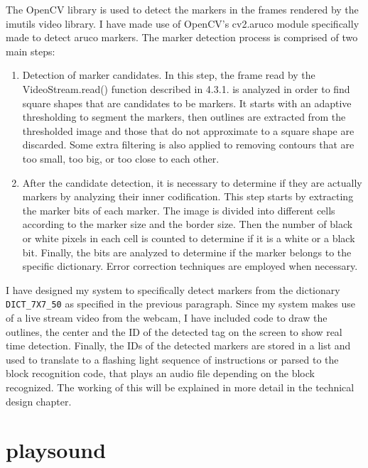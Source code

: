 \documentclass[oneside,%
                    author={Malak Hajji},
                    degree={BSc},
                    title={Designing An Accessible Computational Toolkit For Students},
                  subtitle={With Mixed Visual Abilities}]{dissertation}
\begin{document}
The OpenCV library is used to detect the markers in the frames rendered by the imutils video library. I have made use of OpenCV’s cv2.aruco module specifically made to detect aruco markers. The marker detection process is comprised of two main steps:
\begin{enumerate}
    \item Detection of marker candidates. In this step, the frame read by the VideoStream.read() function described in 4.3.1. is analyzed in order to find square shapes that are candidates to be markers. It starts with an adaptive thresholding to segment the markers, then outlines are extracted from the thresholded image and those that do not approximate to a square shape are discarded. Some extra filtering is also applied to removing contours that are too small, too big, or too close to each other.
    \item After the candidate detection, it is necessary to determine if they are actually markers by analyzing their inner codification. This step starts by extracting the marker bits of each marker. The image is divided into different cells according to the marker size and the border size. Then the number of black or white pixels in each cell is counted to determine if it is a white or a black bit. Finally, the bits are analyzed to determine if the marker belongs to the specific dictionary. Error correction techniques are employed when necessary.
\end{enumerate}
I have designed my system to specifically detect markers from the dictionary \texttt{DICT\_7X7\_50} as specified in the previous paragraph. Since my system makes use of a live stream video from the webcam, I have included code to draw the outlines, the center and the ID of the detected tag on the screen to show real time detection. 
Finally, the IDs of the detected markers are stored in a list and used to translate to a flashing light sequence of instructions or parsed to the block recognition code, that plays an audio file depending on the block recognized. The working of this will be explained in more detail in the technical design chapter.

\section{playsound}
\end{document}
